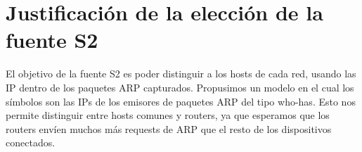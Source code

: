 \section{Justificación de la elección de la fuente S2}

El objetivo de la fuente S2 es poder distinguir a los hosts de cada red, usando las IP dentro de los paquetes ARP capturados. Propusimos un modelo en el cual los símbolos son las IPs de los emisores de paquetes ARP del tipo who-has. Esto nos permite distinguir entre hosts comunes y routers, ya que esperamos que los routers envíen muchos más requests de ARP que el resto de los dispositivos conectados.


